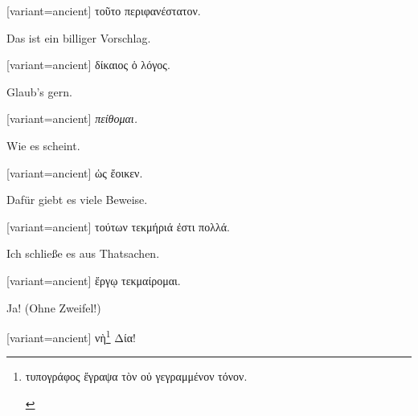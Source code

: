 \switchcolumn

\begin{greek}[variant=ancient]%
τοῦτο περιφανέστατον.

\end{greek}%
\switchcolumn*

Das ist ein billiger Vorschlag. 

\switchcolumn

\begin{greek}[variant=ancient]%
δίκαιος ὁ λόγος.

\end{greek}%
\switchcolumn*

Glaub's gern. 

\switchcolumn

\begin{greek}[variant=ancient]%
\emph{πείθομαι.}

\end{greek}%
\switchcolumn*

Wie es scheint. 

\switchcolumn

\begin{greek}[variant=ancient]%
ὡς ἔοικεν.

\end{greek}%
\switchcolumn*

Dafür giebt es viele Beweise. 

\switchcolumn

\begin{greek}[variant=ancient]%
τούτων τεκμήριά ἐστι πολλά.

\end{greek}%
\switchcolumn*

Ich schließe es aus Thatsachen. 

\switchcolumn

\begin{greek}[variant=ancient]%
ἔργῳ τεκμαίρομαι.

\end{greek}%
\switchcolumn*[


\section{Ja!}

]Ja! (Ohne Zweifel!) 

\switchcolumn

\begin{greek}[variant=ancient]%
νὴ\footnote{\begin{latin}%
\textgreek[variant=ancient]{τυπογράφος ἔγραψα τὸν οὐ γεγραμμένον
τόνον.}\end{latin}%
} Δία!

\end{greek}%
\switchcolumn*


